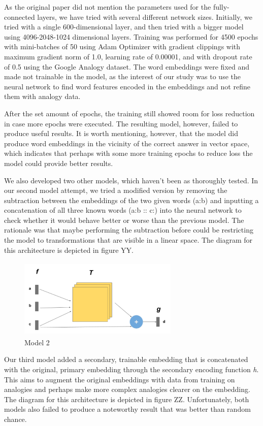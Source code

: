 \documentclass[11pt]{article}
\begin{document}
As the original paper did not mention the parameters used for the
fully-connected layers, we have tried with several different network
sizes. Initially, we tried with a single 600-dimensional layer, and then
tried with a bigger model using 4096-2048-1024 dimensional layers.
Training was performed for 4500 epochs with mini-batches of 50 using
Adam Optimizer with gradient clippings with maximum gradient norm of
1.0, learning rate of 0.00001, and with dropout rate of 0.5 using the
Google Analogy dataset. The word embeddings were fixed and made not
trainable in the model, as the interest of our study was to use the
neural network to find word features encoded in the embeddings and not
refine them with analogy data.

After the set amount of epochs, the training still showed room for loss
reduction in case more epochs were executed. The resulting model,
however, failed to produce useful results. It is worth mentioning,
however, that the model did produce word embeddings in the vicinity of
the correct answer in vector space, which indicates that perhaps with some more training epochs to
reduce loss the model could provide better results.

We also developed two other models, which haven't been as thoroughly
tested. In our second model attempt, we tried a modified version by
removing the subtraction between the embeddings of the two given words
(a:b) and inputting a concatenation of all three known words (a:b :: c:)
into the neural network to check whether it would behave better or worse
than the previous model. The rationale was that maybe performing the
subtraction before could be restricting the model to transformations
that are visible in a linear space. The diagram for this architecture is
depicted in figure YY.

\begin{figure}
  \centering
\includegraphics[width=3.0in,height=1.5in]{./model_2.png}
  \caption{Model 2}
\end{figure}

Our third model added a secondary, trainable embedding that is
concatenated with the original, primary embedding through the secondary
encoding function \emph{h}. This aims to augment the original embeddings
with data from training on analogies and perhaps make more complex
analogies clearer on the embedding. The diagram for this architecture is
depicted in figure ZZ. Unfortunately, both models also failed to produce
a noteworthy result that was better than random chance.
\end{document}
